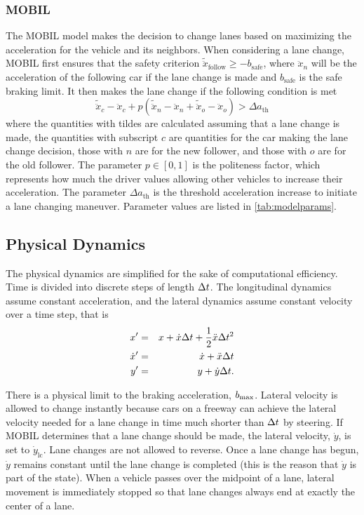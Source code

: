 \subsubsection{MOBIL}

The MOBIL model makes the decision to change lanes based on maximizing the acceleration for the vehicle and its neighbors.
When considering a lane change, MOBIL first ensures that the safety criterion $\tilde{\ddot{x}}_\text{follow} \geq -b_\text{safe}$, where $\ddot{x}_n$ will be the acceleration of the following car if the lane change is made and $b_\text{safe}$ is the safe braking limit. 
It then makes the lane change if the following condition is met
\begin{equation}
    \tilde{\ddot{x}}_c - \ddot{x}_c + p \left( \tilde{\ddot{x}}_n - \ddot{x}_n + \tilde{\ddot{x}}_o - \ddot{x}_o \right) > \Delta a_\text{th}
\end{equation}
where the quantities with tildes are calculated assuming that a lane change is made, the quantities with subscript $c$ are quantities for the car making the lane change decision, those with $n$ are for the new follower, and those with $o$ are for the old follower.
The parameter $p \in [0,1]$ is the politeness factor, which represents how much the driver values allowing other vehicles to increase their acceleration. The parameter $\Delta a_\text{th}$ is the threshold acceleration increase to initiate a lane changing maneuver. Parameter values are listed in \cref{tab:modelparams}.


\subsection{Physical Dynamics} \label{sec:dynamics}

The physical dynamics are simplified for the sake of computational efficiency. Time is divided into discrete steps of length $\Delta t$.
The longitudinal dynamics assume constant acceleration, and the lateral dynamics assume constant velocity over a time step, that is
\begin{eqnarray*}
    x'&=&x + \dot{x} \Delta t + \frac{1}{2} \ddot{x} \Delta t^2 \\
    \dot{x}'&=&\dot{x} + \ddot{x} \Delta t \\
    y'&=&y + \dot{y} \Delta t \text{.}
\end{eqnarray*}

There is a physical limit to the braking acceleration, $b_\text{max}$.
Lateral velocity is allowed to change instantly because cars on a freeway can achieve the lateral velocity needed for a lane change in time much shorter than $\Delta t$ by steering.
If MOBIL determines that a lane change should be made, the lateral velocity, $\dot{y}$, is set to $\dot{y}_\text{lc}$.
Lane changes are not allowed to reverse. Once a lane change has begun, $\dot{y}$ remains constant until the lane change is completed (this is the reason that $\dot{y}$ is part of the state).
When a vehicle passes over the midpoint of a lane, lateral movement is immediately stopped so that lane changes always end at exactly the center of a lane.

